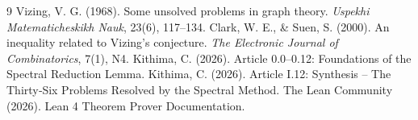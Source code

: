 \documentclass[11pt,a4paper]{article}
\begin{document}

\begin{thebibliography}{9}
  Vizing, V. G. (1968). Some unsolved problems in graph theory. \emph{Uspekhi Matematicheskikh Nauk}, 23(6), 117–134.
  Clark, W. E., \& Suen, S. (2000). An inequality related to Vizing's conjecture. \emph{The Electronic Journal of Combinatorics}, 7(1), N4.
  Kithima, C. (2026). Article 0.0–0.12: Foundations of the Spectral Reduction Lemma.
  Kithima, C. (2026). Article I.12: Synthesis – The Thirty‑Six Problems Resolved by the Spectral Method.
  The Lean Community (2026). Lean 4 Theorem Prover Documentation.
\end{thebibliography}
\end{document}
